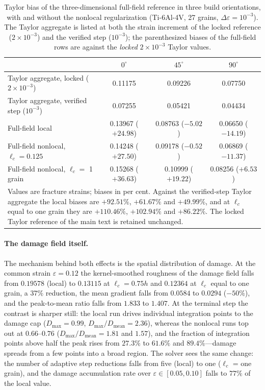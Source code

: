 \documentclass[11pt,a4paper,twocolumn]{article}
\providecommand{\ang}[1]{\ensuremath{#1^{\circ}}}
\begin{document}
\begin{table}[htbp]
\centering
\caption{Taylor bias of the three-dimensional full-field reference in three build orientations, with and
without the nonlocal regularization (Ti-6Al-4V, 27 grains, $\Delta\varepsilon = 10^{-3}$). The Taylor aggregate
is listed at both the strain increment of the locked reference ($2\times10^{-3}$) and the verified step
($10^{-3}$); the parenthesized biases of the full-field rows are against the \emph{locked} $2\times10^{-3}$
Taylor values.}
\label{tab:nonlocal_bias}
\footnotesize
\setlength{\tabcolsep}{3pt}
\begin{tabular}{p{}ccc}
\toprule
 & $\ang{0}$ & $\ang{45}$ & $\ang{90}$ \\
\midrule
Taylor aggregate, locked ($2\times10^{-3}$) & 0.11175 & 0.09226 & 0.07750 \\
Taylor aggregate, verified step ($10^{-3}$) & 0.07255 & 0.05421 & 0.04434 \\
Full-field local & 0.13967 ($+24.98$) & 0.08763 ($-5.02$) & 0.06650 ($-14.19$) \\
Full-field nonlocal, $\ell_c = 0.125$ & 0.14248 ($+27.50$) & 0.09178 ($-0.52$) & 0.06869 ($-11.37$) \\
Full-field nonlocal, $\ell_c = $ 1 grain & 0.15268 ($+36.63$) & 0.10999 ($+19.22$) & 0.08256 ($+6.53$) \\
\bottomrule
\multicolumn{4}{p{0.97\textwidth}}{\footnotesize Values are fracture strains; biases in per cent. Against the
verified-step Taylor aggregate the local biases are $+92.51\%$, $+61.67\%$ and $+49.99\%$, and at $\ell_c$ equal
to one grain they are $+110.46\%$, $+102.94\%$ and $+86.22\%$. The locked Taylor reference of the main text is
retained unchanged.}
\end{tabular}
\end{table}

\paragraph{The damage field itself.} The mechanism behind both effects is the spatial distribution of damage.
At the common strain $\varepsilon = 0.12$ the kernel-smoothed roughness of the damage field falls from $0.19578$
(local) to $0.13115$ at $\ell_c = 0.75h$ and $0.12364$ at $\ell_c$ equal to one grain, a $37\%$ reduction, the
mean gradient falls from $0.0584$ to $0.0294$ ($-50\%$), and the peak-to-mean ratio falls from $1.833$ to
$1.407$. At the terminal step the contrast is sharper still: the local run drives individual integration points
to the damage cap ($D_{\max} = 0.99$, $D_{\max}/D_{\mathrm{mean}} = 2.36$), whereas the nonlocal runs top out
at $0.66$--$0.76$ ($D_{\max}/D_{\mathrm{mean}} = 1.81$ and $1.57$), and the fraction of integration points
above half the peak rises from $27.3\%$ to $61.6\%$ and $89.4\%$---damage spreads from a few points into a
broad region. The solver sees the same change: the number of adaptive step reductions falls from five (local)
to one ($\ell_c$ = one grain), and the damage accumulation rate over $\varepsilon \in [0.05, 0.10]$ falls to
$77\%$ of the local value.
\end{document}
